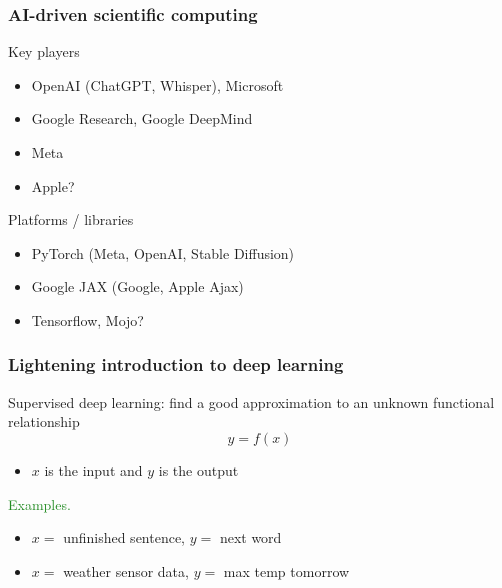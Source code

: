 \documentclass[
    xcolor={svgnames,dvipsnames},
    hyperref={colorlinks, citecolor=DeepPink4, linkcolor=DarkRed, urlcolor=DarkBlue}
    ]{beamer}  %
\newcommand{\Egs}{\textcolor{ForestGreen}{Examples. }}
\newcommand{\1}{\mathbbm 1}
\begin{document}
\begin{frame}
    \frametitle{AI-driven scientific computing}

    Key players
    \begin{itemize}
        \item OpenAI (ChatGPT, Whisper), Microsoft 
        \vspace{0.5em}
        \item Google Research, Google DeepMind
        \vspace{0.5em}
        \item Meta
        \vspace{0.5em}
        \item Apple?
    \end{itemize}

    Platforms / libraries

    \begin{itemize}
        \item PyTorch (Meta, OpenAI, Stable Diffusion)
        \vspace{0.5em}
        \item Google JAX (Google, Apple Ajax)
        \vspace{0.5em}
        \item Tensorflow, Mojo?
    \end{itemize}
    
\end{frame}


\begin{frame}
    \frametitle{Lightening introduction to deep learning}
    
    Supervised deep learning: find a good approximation to an unknown functional
    relationship
    \begin{equation*}
        y = f(x)
    \end{equation*}

    \begin{itemize}
        \item $x$ is the input and $y$ is the output
    \end{itemize}

        \vspace{0.5em}
        \vspace{0.5em}
        \vspace{0.5em}
    \Egs
    \begin{itemize}
        \item $x = $ unfinished sentence, $y = $ next word
        \vspace{0.5em}
        \item $x = $ weather sensor data, $y = $ max temp tomorrow
    \end{itemize}

\end{frame}
\end{document}

